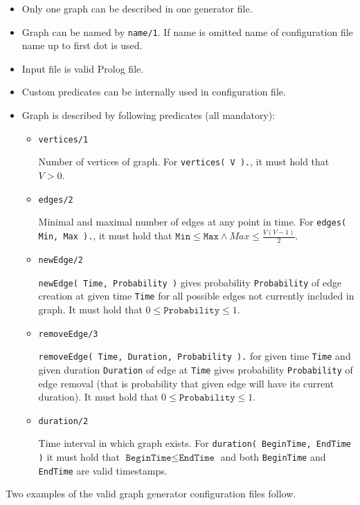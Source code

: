\documentclass[11pt, a4paper]{article}
\newcommand{\pl}[1]{\texttt{#1}} %
\theoremstyle{plain}
\theoremstyle{definition}
\theoremstyle{remark}
\begin{document}
\begin{itemize}
    \item Only one graph can be described in one generator file.
    \item Graph can be named by \pl{name/1}. If name is omitted name of configuration file name
        up to first dot is used.
    \item Input file is valid Prolog file.
    \item Custom predicates can be internally used in configuration file.
    \item Graph is described by following predicates (all mandatory): 
        \begin{itemize}
            \item \pl{vertices/1}

                Number of vertices of graph. For \pl{vertices( V ).}, it must hold that $V > 0$.
            \item \pl{edges/2}

                Minimal and maximal number of edges at any point in time.
                For \pl{edges( Min, Max ).}, it must hold that
                $\pl{Min} \le \pl{Max} \land Max \le \frac{ V(V-1)}{2}$.
            \item \pl{newEdge/2}

                \pl{newEdge( Time, Probability )} gives probability \pl{Probability} of
                edge creation at given time \pl{Time} for all possible edges not currently
                included in graph. It must hold that $0 \le \pl{Probability} \le 1$.
            \item \pl{removeEdge/3}
                
                \pl{removeEdge( Time, Duration, Probability ).} for given time \pl{Time}
                and given duration \pl{Duration} of edge at \pl{Time} gives
                probability \pl{Probability} of edge removal (that is probability
                that given edge will have its current duration).
                It must hold that $0 \le \pl{Probability} \le 1$.
            \item \pl{duration/2}

                Time interval in which graph exists. For \pl{duration( BeginTime, EndTime )}
                it must hold that  $\pl{BeginTime} \le \pl{EndTime}$ and both
                \pl{BeginTime} and \pl{EndTime} are valid timestamps.
        \end{itemize}

\end{itemize}
Two examples of the valid graph generator configuration files follow.
\end{document}
